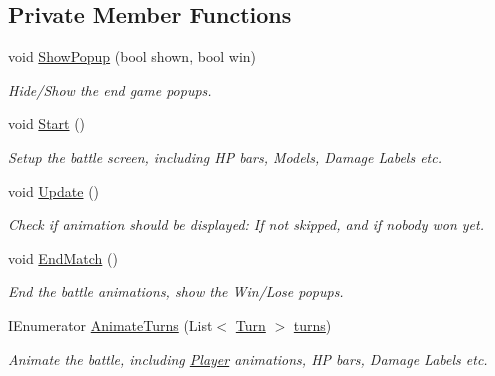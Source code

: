\subsection*{Private Member Functions}
\begin{DoxyCompactItemize}
\item 
void \mbox{\hyperlink{class_gameplay_a26e8c55ca4dbbfb1898a3a7bb06d679d}{Show\+Popup}} (bool shown, bool win)
\begin{DoxyCompactList}\small\item\em Hide/\+Show the end game popups. \end{DoxyCompactList}\item 
void \mbox{\hyperlink{class_gameplay_a3262248fce4aeecf5de2486bb3305de3}{Start}} ()
\begin{DoxyCompactList}\small\item\em Setup the battle screen, including HP bars, Models, Damage Labels etc. \end{DoxyCompactList}\item 
void \mbox{\hyperlink{class_gameplay_a0b4601bd58b54a27d9c4d3c6c9b72d8c}{Update}} ()
\begin{DoxyCompactList}\small\item\em Check if animation should be displayed\+: If not skipped, and if nobody won yet. \end{DoxyCompactList}\item 
void \mbox{\hyperlink{class_gameplay_ab30c33d44acef3478ae5b601c14a4346}{End\+Match}} ()
\begin{DoxyCompactList}\small\item\em End the battle animations, show the Win/\+Lose popups. \end{DoxyCompactList}\item 
I\+Enumerator \mbox{\hyperlink{class_gameplay_a0d0ef2766c769e58dbd93b3467a40d0b}{Animate\+Turns}} (List$<$ \mbox{\hyperlink{class_turn}{Turn}} $>$ \mbox{\hyperlink{class_gameplay_a835615e1b6b33c0340b1a6a00aff92ef}{turns}})
\begin{DoxyCompactList}\small\item\em Animate the battle, including \mbox{\hyperlink{class_player}{Player}} animations, HP bars, Damage Labels etc. \end{DoxyCompactList}\end{DoxyCompactItemize}
